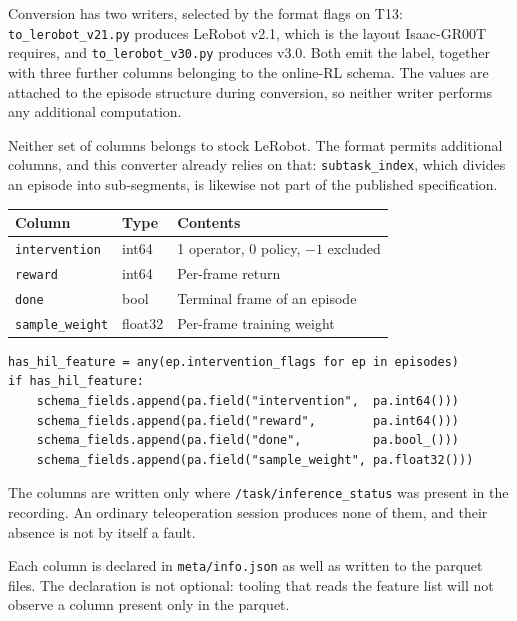 \documentclass[11pt,a4paper]{article}
\begin{document}
Conversion has two writers, selected by the format flags on T13:
\texttt{to\_lerobot\_v21.py} produces LeRobot v2.1, which is the layout
Isaac-GR00T requires, and \texttt{to\_lerobot\_v30.py} produces v3.0. Both emit
the label, together with three further columns belonging to the online-RL
schema. The values are attached to the episode structure during conversion, so
neither writer performs any additional computation.

Neither set of columns belongs to stock LeRobot. The format permits additional
columns, and this converter already relies on that: \texttt{subtask\_index},
which divides an episode into sub-segments, is likewise not part of the
published specification.

\begin{center}
\small
\begin{tabular}{@{}lll@{}}
\toprule
\textbf{Column} & \textbf{Type} & \textbf{Contents}\\
\midrule
\texttt{intervention}   & int64   & 1 operator, 0 policy, $-1$ excluded\\
\texttt{reward}         & int64   & Per-frame return\\
\texttt{done}           & bool    & Terminal frame of an episode\\
\texttt{sample\_weight} & float32 & Per-frame training weight\\
\bottomrule
\end{tabular}
\end{center}

\begin{lstlisting}[style=py,caption={Schema block, common to both writers}]
has_hil_feature = any(ep.intervention_flags for ep in episodes)
if has_hil_feature:
    schema_fields.append(pa.field("intervention",  pa.int64()))
    schema_fields.append(pa.field("reward",        pa.int64()))
    schema_fields.append(pa.field("done",          pa.bool_()))
    schema_fields.append(pa.field("sample_weight", pa.float32()))
\end{lstlisting}

The columns are written only where \texttt{/task/inference\_status} was present
in the recording. An ordinary teleoperation session produces none of them, and
their absence is not by itself a fault.

Each column is declared in \texttt{meta/info.json} as well as written to the
parquet files. The declaration is not optional: tooling that reads the feature
list will not observe a column present only in the parquet.
\end{document}
